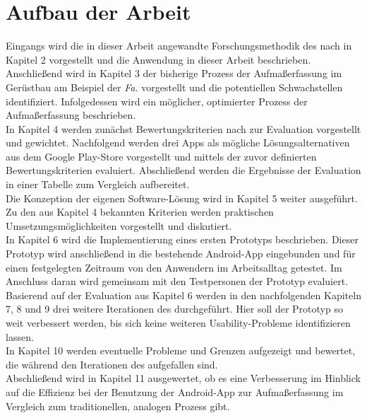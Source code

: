 \section{Aufbau der Arbeit}
Eingangs wird die in dieser Arbeit angewandte Forschungsmethodik des \hcdp{} nach \citet{Norman13} in Kapitel 2 vorgestellt und die Anwendung in dieser Arbeit beschrieben. \\

Anschließend wird in Kapitel 3 der bisherige Prozess der Aufmaßerfassung im Gerüstbau am Beispiel der \emph{Fa.} \vr{} vorgestellt und die potentiellen Schwachstellen identifiziert. 
Infolgedessen wird ein möglicher, optimierter Prozess der Aufmaßerfassung beschrieben. \\

In Kapitel 4 werden zunächst Bewertungskriterien nach \citet{Nielsen94} zur Evaluation vorgestellt und gewichtet.
Nachfolgend werden drei Apps als mögliche Lösungsalternativen aus dem Google Play-Store vorgestellt und mittels der zuvor definierten Bewertungskriterien evaluiert.
Abschließend werden die Ergebnisse der Evaluation in einer Tabelle zum Vergleich aufbereitet. \\

Die Konzeption der eigenen Software-Lösung wird in Kapitel 5 weiter ausgeführt.
Zu den aus Kapitel 4 bekannten Kriterien werden praktischen Umsetzungsmöglichkeiten vorgestellt und diskutiert. \\

In Kapitel 6 wird die Implementierung eines ersten Prototyps beschrieben.
Dieser Prototyp wird anschließend in die bestehende Android-App eingebunden und für einen festgelegten Zeitraum von den Anwendern im Arbeitsalltag getestet.
Im Anschluss daran wird gemeinsam mit den Testpersonen der Prototyp evaluiert. \\

Basierend auf der Evaluation aus Kapitel 6 werden in den nachfolgenden Kapiteln 7, 8 und 9 drei weitere Iterationen des \hcdp{} durchgeführt.
Hier soll der Prototyp so weit verbessert werden, bis sich keine weiteren Usability-Probleme identifizieren lassen. \\

In Kapitel 10 werden eventuelle Probleme und Grenzen aufgezeigt und bewertet, die während den Iterationen des \hcdp{} aufgefallen sind. \\

Abschließend wird in Kapitel 11 ausgewertet, ob es eine Verbesserung im Hinblick auf die Effizienz bei der Benutzung der Android-App zur Aufmaßerfassung im Vergleich zum traditionellen, analogen Prozess gibt.
